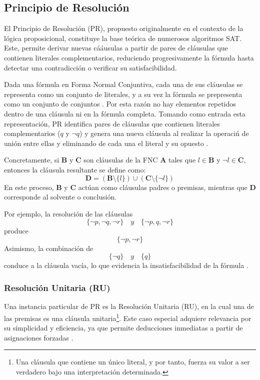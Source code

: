 \subsection{Principio de Resoluci\'on}
\label{subsec:prncp-de-res}
El Principio de Resoluci\'on (PR), propuesto originalmente en el contexto de la l\'ogica proposicional, constituye la base te\'orica de numerosos algoritmos SAT. Este, permite derivar nuevas c\'aáusulas a partir de pares de cl\'ausulas que contienen literales complementarios, reduciendo progresivamente la fórmula hasta detectar una contradicci\'on o verificar su satisfacibilidad. 

Dada una f\'ormula en Forma Normal Conjuntiva, cada una de sus cl\'ausulas se representa como un conjunto de literales, y a su vez la f\'ormula se prepresenta como un conjunto de conjuntos \cite{garcia-satcap}. Por esta raz\'on no hay elementos repetidos dentro de una cláusula ni en la fórmula completa. Tomando como entrada esta representación, PR identifica pares de cláusulas que contienen literales complementarios ($q$ y $\neg q$) y genera una nueva cláusula al realizar la operaci\'n de uni\'on entre ellas y eliminando de cada una el literal y su opuesto \cite{garcia-satcap}.

Concretamente, si \(\mathbf{B}\) y \(\mathbf{C}\) son cláusulas de la FNC \(\mathbf{A}\) tales que \(l\in\mathbf{B}\) y \(\neg l\in\mathbf{C}\), entonces la cláusula resultante se define como:
\[
\mathbf{D}=(\mathbf{B}\setminus\{l\})\cup(\mathbf{C}\setminus\{\neg l\})
\]
En este proceso, \(\mathbf{B}\) y \(\mathbf{C}\) actúan como cláusulas padres o premisas, mientras que \(\mathbf{D}\) corresponde al solvente o conclusión.

Por ejemplo, la resolución de las cláusulas
\[
\{\neg p,\neg q,\neg r\}\quad y\quad\{\neg p,q,\neg r\}
\]
produce
\[
\{\neg p,\neg r\}
\]
Asimismo, la combinación de
\[
\{\neg q\}\quad y\quad\{q\}
\]
conduce a la cláusula vacía, lo que evidencia la insatisfacibilidad de la fórmula \cite{garcia-satcap}.

\subsubsection{Resoluci\'on Unitaria (RU)}
\label{subsubsec:res-unit}
Una instancia particular de PR es la Resoluci\'on Unitaria (RU), en la cual una de las premisas es una cl\'ausula unitaria\footnote{Una cl\'ausula que contiene un \'unico literal, y por tanto, fuerza su valor a ser verdadero bajo una interpretaci\'on determinada.}. Este caso especial adquiere relevancia por su simplicidad y eficiencia, ya que permite deducciones inmediatas a partir de asignaciones forzadas \cite{garcia-satcap}.

